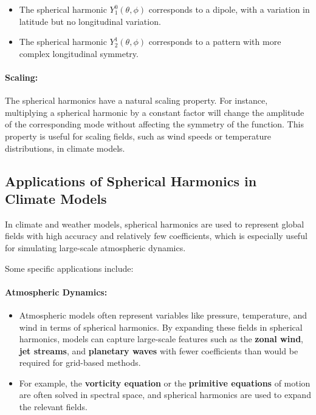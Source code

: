 \begin{itemize}
	\item The spherical harmonic $Y_1^0(\theta,\phi)$ corresponds to a dipole, with a variation in latitude but no longitudinal variation.
	\item The spherical harmonic $Y_2^1(\theta,\phi)$ corresponds to a pattern with more complex longitudinal symmetry.
\end{itemize}

\paragraph{\textbf{Scaling}:}

The spherical harmonics have a natural scaling property. For instance, multiplying a spherical harmonic by a constant factor will change the amplitude of the corresponding mode without affecting the symmetry of the function. This property is useful for scaling fields, such as wind speeds or temperature distributions, in climate models.

\subsection{Applications of Spherical Harmonics in Climate Models}

In climate and weather models, spherical harmonics are used to represent global fields with high accuracy and relatively few coefficients, which is especially useful for simulating large-scale atmospheric dynamics.

Some specific applications include:

\paragraph{\textbf{Atmospheric Dynamics}:}

\begin{itemize}
	\item Atmospheric models often represent variables like pressure, temperature, and wind in terms of spherical harmonics. By expanding these fields in spherical harmonics, models can capture large-scale features such as the \textbf{zonal wind}, \textbf{jet streams}, and \textbf{planetary waves} with fewer coefficients than would be required for grid-based methods.
	\item For example, the \textbf{vorticity equation} or the \textbf{primitive equations} of motion are often solved in spectral space, and spherical harmonics are used to expand the relevant fields.
\end{itemize}

